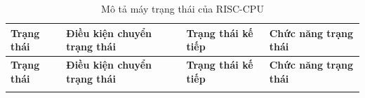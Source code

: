         \begin{longtable}{|p{}|p{}|p{}|p{}|}
            \hline
            \textbf{Trạng thái} & \textbf{Điều kiện chuyển trạng thái} & \textbf{Trạng thái kế tiếp} & \textbf{Chức năng trạng thái} \\
            \hline
            \endfirsthead

            \hline
            \textbf{Trạng thái} & \textbf{Điều kiện chuyển trạng thái} & \textbf{Trạng thái kế tiếp} & \textbf{Chức năng trạng thái} \\
            \hline
            \endhead

            \hline
            \endfoot

            \hline
            \caption{Mô tả máy trạng thái của RISC-CPU}
            \endlastfoot


\end{longtable}
